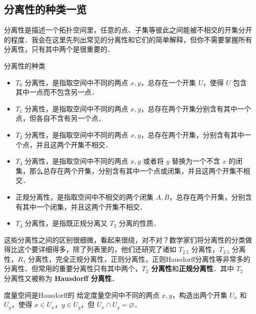 

\subsection{分离性的种类一览}

分离性是描述一个拓扑空间里，任意的点、子集等彼此之间能被不相交的开集分开的程度．我会在这里先列出常见的分离性和它们的简单解释，但你不需要掌握所有分离性，只有其中两个是很重要的．

\begin{definition}{分离性的种类}\label{Topo5_def1}
\begin{itemize}

\item $T_0$ 分离性，是指取空间中不同的两点 $x,y$，总存在一个开集 $U$，使得 $U$ 包含其中一点而不包含另一点．
\item $T_1$ 分离性，是指取空间中不同的两点 $x,y$，总存在两个开集分别含有其中一个点，但各自不含有另一个点．
\item $T_2$ 分离性，是指取空间中不同的两点 $x,y$，总存在两个开集，分别含有其中一个点，并且这两个开集不相交．
\item $T_3$ 分离性，是指取空间中不同的两点 $x,y$ 或者将 $y$ 替换为一个不含 $x$ 的闭集，那么总存在两个开集，分别含有其中一个点或闭集，并且这两个开集不相交．
\item 正规分离性，是指取空间中不相交的两个闭集 $A, B$，总存在两个开集，分别含有其中一个闭集，并且这两个开集不相交．
\item $T_4$ 分离性，是指既正规分离又 $T_2$ 分离的性质．


\end{itemize}
\end{definition}

这些分离性之间的区别很细微，看起来很绕，对不对？数学家们将分离性的分类做得比这个要详细得多，除了列表里的，他们还研究了诸如 $T_{2.5}$ 分离性，$T_{3.5}$ 分离性，$R_1$ 分离性，完全正规分离性，正则分离性，正则Hausdorff分离性等非常多的分离性．但常用的重要分离性只有其中两个，\textbf{$T_2$ 分离性}和\textbf{正规分离性}．其中 $T_2$ 分离性又被称为 \textbf{Hausdorff 分离性}．

\begin{exercise}{度量空间是Hausdorff的}\label{Topo5_exe1}
给定度量空间中不同的两点 $x, y$，构造出两个开集 $U_x$ 和 $U_y$，使得 $x\in U_x$，$y\in U_y$，但 $U_x\cap U_y=\varnothing$．
\end{exercise}


